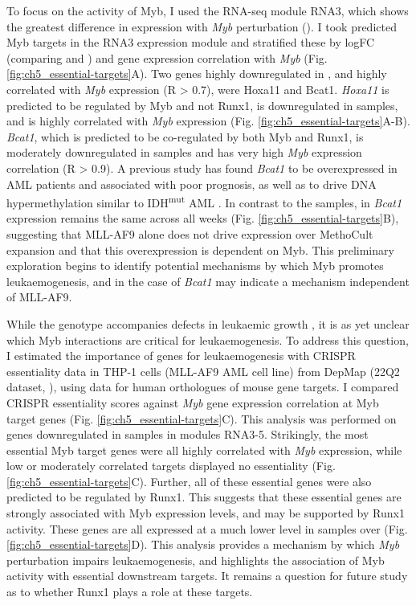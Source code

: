 To focus on the activity of Myb, I used the RNA-seq module RNA3, which shows the greatest difference in expression with \textit{Myb} perturbation (\mybmre{}). I took predicted Myb targets in the RNA3 expression module and stratified these by logFC (comparing \mybwt{} and \mybmre{}) and gene expression correlation with \textit{Myb} (Fig. \ref{fig:ch5_essential-targets}A). Two genes highly downregulated in \mybmre{}, and highly correlated with \textit{Myb} expression (R > 0.7), were Hoxa11 and Bcat1. \textit{Hoxa11} is predicted to be regulated by Myb and not Runx1, is downregulated in \mybmre{} samples, and is highly correlated with \textit{Myb} expression (Fig. \ref{fig:ch5_essential-targets}A-B). \textit{Bcat1}, which is predicted to be co-regulated by both Myb and Runx1, is moderately downregulated in \mybmre{} samples and has very high \textit{Myb} expression correlation (R > 0.9). A previous study has found \textit{Bcat1} to be overexpressed in AML patients and associated with poor prognosis, as well as to drive DNA hypermethylation similar to IDH\textsuperscript{mut} AML \citep{raffel_bcat1_2017}. In contrast to the \mybwt{} samples, in \mybmre{} \textit{Bcat1} expression remains the same across all weeks (Fig. \ref{fig:ch5_essential-targets}B), suggesting that MLL-AF9 alone does not drive expression over MethoCult expansion and that this overexpression is dependent on Myb. This preliminary exploration begins to identify potential mechanisms by which Myb promotes leukaemogenesis, and in the case of \textit{Bcat1} may indicate a mechanism independent of MLL-AF9.

While the \mybmre{} genotype accompanies defects in leukaemic growth \citep{lau_role_2022}, it is as yet unclear which Myb interactions are critical for leukaemogenesis. To address this question, I estimated the importance of genes for leukaemogenesis with CRISPR essentiality data in THP-1 cells (MLL-AF9 AML cell line) from DepMap (22Q2 dataset, \cite{meyers_computational_2017, doench_optimized_2016}), using data for human orthologues of mouse gene targets. I compared CRISPR essentiality scores against \textit{Myb} gene expression correlation at Myb target genes (Fig. \ref{fig:ch5_essential-targets}C). This analysis was performed on genes downregulated in \mybmre{} samples in modules RNA3-5. Strikingly, the most essential Myb target genes were all highly correlated with \textit{Myb} expression, while low or moderately correlated targets displayed no essentiality (Fig. \ref{fig:ch5_essential-targets}C). Further, all of these essential genes were also predicted to be regulated by Runx1. This suggests that these essential genes are strongly associated with Myb expression levels, and may be supported by Runx1 activity. These genes are all expressed at a much lower level in \mybmre{} samples over \mybwt{} (Fig. \ref{fig:ch5_essential-targets}D). This analysis provides a mechanism by which \textit{Myb} perturbation impairs leukaemogenesis, and highlights the association of Myb activity with essential downstream targets. It remains a question for future study as to whether Runx1 plays a role at these targets.

